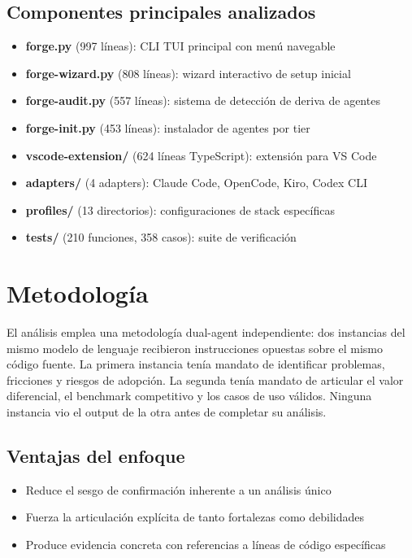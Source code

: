 \documentclass[11pt,a4paper]{article}
\begin{document}
\subsection*{Componentes principales analizados}

\begin{itemize}[leftmargin=1.5em]
  \item \textbf{forge.py} (997 líneas): CLI TUI principal con menú navegable
  \item \textbf{forge-wizard.py} (808 líneas): wizard interactivo de setup inicial
  \item \textbf{forge-audit.py} (557 líneas): sistema de detección de deriva de agentes
  \item \textbf{forge-init.py} (453 líneas): instalador de agentes por tier
  \item \textbf{vscode-extension/} (624 líneas TypeScript): extensión para VS Code
  \item \textbf{adapters/} (4 adapters): Claude Code, OpenCode, Kiro, Codex CLI
  \item \textbf{profiles/} (13 directorios): configuraciones de stack específicas
  \item \textbf{tests/} (210 funciones, 358 casos): suite de verificación
\end{itemize}

\section{Metodología}

El análisis emplea una metodología dual-agent independiente: dos instancias del mismo modelo de lenguaje recibieron instrucciones opuestas sobre el mismo código fuente. La primera instancia tenía mandato de identificar problemas, fricciones y riesgos de adopción. La segunda tenía mandato de articular el valor diferencial, el benchmark competitivo y los casos de uso válidos. Ninguna instancia vio el output de la otra antes de completar su análisis.

\subsection*{Ventajas del enfoque}

\begin{itemize}[leftmargin=1.5em]
  \item Reduce el sesgo de confirmación inherente a un análisis único
  \item Fuerza la articulación explícita de tanto fortalezas como debilidades
  \item Produce evidencia concreta con referencias a líneas de código específicas
\end{itemize}
\end{document}
